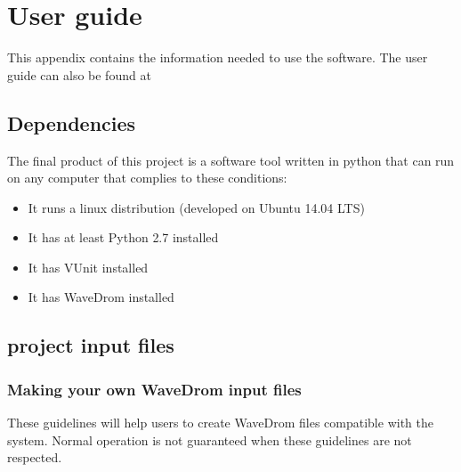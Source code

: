 \chapter{User guide}\label{user_guide}
This appendix contains the information needed to use the software. The user guide can also be found at \cite{user_guide}

\section{Dependencies}
The final product of this project is a software tool written in python that can run on any computer that complies to these conditions:
\begin{itemize}
	\item It runs a linux distribution (developed on Ubuntu 14.04 LTS)
	\item It has at least Python \cite{python} 2.7 installed
	\item It has VUnit \cite{vunit_doc} installed
	\item It has WaveDrom \cite{wavedrom} installed
\end{itemize}\newpage
\section{project input files}
\subsection{Making your own WaveDrom input files}
These guidelines will help users to create WaveDrom files compatible with the system. Normal operation is not guaranteed when these guidelines are not respected.
